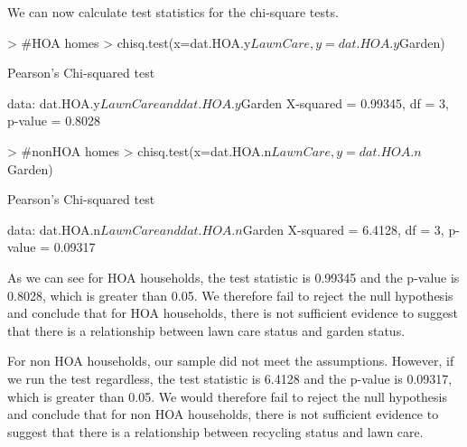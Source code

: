 \documentclass{article}
\begin{document}
We can now calculate test statistics for the chi-square tests. 
\begin{Schunk}
\begin{Sinput}
> #HOA homes
> chisq.test(x=dat.HOA.y$LawnCare,y=dat.HOA.y$Garden)
\end{Sinput}
\begin{Soutput}
	Pearson's Chi-squared test

data:  dat.HOA.y$LawnCare and dat.HOA.y$Garden
X-squared = 0.99345, df = 3, p-value = 0.8028
\end{Soutput}
\begin{Sinput}
> #nonHOA homes
> chisq.test(x=dat.HOA.n$LawnCare,y=dat.HOA.n$Garden)
\end{Sinput}
\begin{Soutput}
	Pearson's Chi-squared test

data:  dat.HOA.n$LawnCare and dat.HOA.n$Garden
X-squared = 6.4128, df = 3, p-value = 0.09317
\end{Soutput}
\end{Schunk}
As we can see for HOA households, the test statistic is 0.99345 and the p-value is 0.8028, which is greater than 0.05. We therefore fail to reject the null hypothesis and conclude that for HOA households, there is not sufficient evidence to suggest that there is a relationship between lawn care status and garden status. 

For non HOA households, our sample did not meet the assumptions. However, if we run the test regardless, the test statistic is 6.4128 and the p-value is 0.09317, which is greater than 0.05. We would therefore fail to reject the null hypothesis and conclude that for non HOA households, there is not sufficient evidence to suggest that there is a relationship between recycling status and lawn care.
\end{document}
